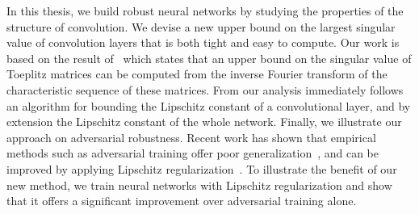 In this thesis, we build robust neural networks by studying the properties of the structure of convolution.
We devise a new upper bound on the largest singular value of convolution layers that is both tight and easy to compute.
Our work is based on the result of~\citet{gray2006toeplitz} which states that an upper bound on the singular value of Toeplitz matrices can be computed from the inverse Fourier transform of the characteristic sequence of these matrices.
From our analysis immediately follows an algorithm for bounding the Lipschitz constant of a convolutional layer, and by extension the Lipschitz constant of the whole network.
Finally, we illustrate our approach on adversarial robustness.
Recent work has shown that empirical methods such as adversarial training offer poor generalization~\cite{schmidt2018adversarially}, and can be improved by applying Lipschitz regularization~\cite{farnia2018generalizable}.
To illustrate the benefit of our new method, we train neural networks with Lipschitz regularization and show that it offers a significant improvement over adversarial training alone.





